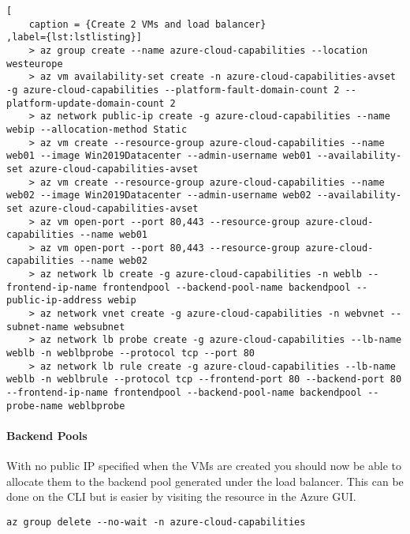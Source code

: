 \documentclass[a4paper,14pt]{report}
\begin{document}
\begin{lstlisting}[
    caption = {Create 2 VMs and load balancer}
,label={lst:lstlisting}]
    > az group create --name azure-cloud-capabilities --location westeurope
    > az vm availability-set create -n azure-cloud-capabilities-avset -g azure-cloud-capabilities --platform-fault-domain-count 2 --platform-update-domain-count 2
    > az network public-ip create -g azure-cloud-capabilities --name webip --allocation-method Static
    > az vm create --resource-group azure-cloud-capabilities --name web01 --image Win2019Datacenter --admin-username web01 --availability-set azure-cloud-capabilities-avset
    > az vm create --resource-group azure-cloud-capabilities --name web02 --image Win2019Datacenter --admin-username web02 --availability-set azure-cloud-capabilities-avset
    > az vm open-port --port 80,443 --resource-group azure-cloud-capabilities --name web01
    > az vm open-port --port 80,443 --resource-group azure-cloud-capabilities --name web02
    > az network lb create -g azure-cloud-capabilities -n weblb --frontend-ip-name frontendpool --backend-pool-name backendpool --public-ip-address webip
    > az network vnet create -g azure-cloud-capabilities -n webvnet --subnet-name websubnet
    > az network lb probe create -g azure-cloud-capabilities --lb-name weblb -n weblbprobe --protocol tcp --port 80
    > az network lb rule create -g azure-cloud-capabilities --lb-name weblb -n weblbrule --protocol tcp --frontend-port 80 --backend-port 80 --frontend-ip-name frontendpool --backend-pool-name backendpool --probe-name weblbprobe
\end{lstlisting}

\paragraph{Backend Pools} With no public IP specified when the VMs are created you should now be able to allocate them to the
backend pool generated under the load balancer. This can be done on the CLI but is easier by visiting the resource in
the Azure GUI.
\begin{lstlisting}[caption={To Delete All Resources In The Group}]
az group delete --no-wait -n azure-cloud-capabilities
\end{lstlisting}
\end{document}
